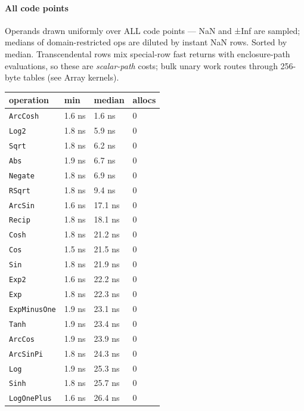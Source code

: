 \paragraph{All code points}\indent



\label{8134844262983830456}{}


Operands drawn uniformly over ALL code points — NaN and ±Inf are sampled; medians of domain-restricted ops are diluted by instant NaN rows. Sorted by median. Transcendental rows mix special-row fast returns with enclosure-path evaluations, so these are \emph{scalar-path} costs; bulk unary work routes through 256-byte tables (see Array kernels).




\begin{table}[h]
\centering
\nopagebreak[3]
\begin{tabulary}{\linewidth}{L L L L}
\toprule
operation & min & median & allocs \\
\toprule
\texttt{ArcCosh} & 1.6 ns & 1.6 ns & 0 \\
\texttt{Log2} & 1.8 ns & 5.9 ns & 0 \\
\texttt{Sqrt} & 1.8 ns & 6.2 ns & 0 \\
\texttt{Abs} & 1.9 ns & 6.7 ns & 0 \\
\texttt{Negate} & 1.8 ns & 6.9 ns & 0 \\
\texttt{RSqrt} & 1.8 ns & 9.4 ns & 0 \\
\texttt{ArcSin} & 1.6 ns & 17.1 ns & 0 \\
\texttt{Recip} & 1.8 ns & 18.1 ns & 0 \\
\texttt{Cosh} & 1.8 ns & 21.2 ns & 0 \\
\texttt{Cos} & 1.5 ns & 21.5 ns & 0 \\
\texttt{Sin} & 1.8 ns & 21.9 ns & 0 \\
\texttt{Exp2} & 1.6 ns & 22.2 ns & 0 \\
\texttt{Exp} & 1.8 ns & 22.3 ns & 0 \\
\texttt{ExpMinusOne} & 1.9 ns & 23.1 ns & 0 \\
\texttt{Tanh} & 1.9 ns & 23.4 ns & 0 \\
\texttt{ArcCos} & 1.9 ns & 23.9 ns & 0 \\
\texttt{ArcSinPi} & 1.8 ns & 24.3 ns & 0 \\
\texttt{Log} & 1.9 ns & 25.3 ns & 0 \\
\texttt{Sinh} & 1.8 ns & 25.7 ns & 0 \\
\texttt{LogOnePlus} & 1.6 ns & 26.4 ns & 0 \\

\end{tabulary}
\end{table}

